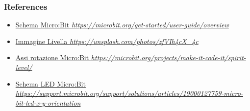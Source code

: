 \documentclass{beamer}
\begin{document}
\begin{frame}
	\frametitle{References}
	\begin{itemize}
		\item \href{https://microbit.org/get-started/user-guide/overview/}{Schema Micro:Bit \textit{https://microbit.org/get-started/user-guide/overview}}
		\item \href{https://unsplash.com/photos/zfVIh4cX_4c}{Immagine Livella \textit{https://unsplash.com/photos/zfVIh4cX\_4c}} 
		\item \href{https://microbit.org/projects/make-it-code-it/spirit-level/}{Assi rotazione Micro:Bit \textit{https://microbit.org/projects/make-it-code-it/spirit-level/}}
		\item \href{https://support.microbit.org/support/solutions/articles/19000127759-micro-bit-led-x-y-orientation}{Schema LED Micro:Bit \textit{https://support.microbit.org/support/solutions/articles/19000127759-micro-bit-led-x-y-orientation}}
	\end{itemize}
\end{frame}
\end{document}
